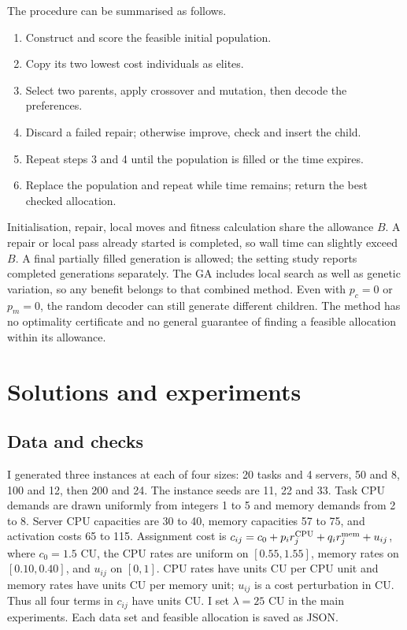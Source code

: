 \documentclass[10pt,a4paper]{article}
\begin{document}
\begin{minipage}{\textwidth}
The procedure can be summarised as follows.
\begin{enumerate}
\item Construct and score the feasible initial population.
\item Copy its two lowest cost individuals as elites.
\item Select two parents, apply crossover and mutation, then decode the preferences.
\item Discard a failed repair; otherwise improve, check and insert the child.
\item Repeat steps 3 and 4 until the population is filled or the time expires.
\item Replace the population and repeat while time remains; return the best checked allocation.
\end{enumerate}
\end{minipage}

Initialisation, repair, local moves and fitness calculation share the allowance
$B$. A repair or local pass already started is completed, so wall time can
slightly exceed $B$. A final partially filled generation is allowed; the setting
study reports completed generations separately. The GA includes local search
as well as genetic variation, so any benefit belongs to that combined method.
Even with $p_c=0$ or $p_m=0$, the random decoder can still generate different
children. The method has no optimality certificate and no general guarantee
of finding a feasible allocation within its allowance.

\section{Solutions and experiments}

\subsection{Data and checks}\label{sec:data-checks}

I generated three instances at each of four sizes: 20 tasks and 4 servers, 50
and 8, 100 and 12, then 200 and 24. The instance seeds are 11, 22 and 33.
Task CPU demands are drawn uniformly from integers 1 to 5 and memory demands
from 2 to 8. Server CPU capacities are 30 to 40, memory capacities 57 to 75,
and activation costs 65 to 115. Assignment cost is
$c_{ij}=c_0+p_ir^{\rm CPU}_j+q_ir^{\rm mem}_j+u_{ij}$, where $c_0=1.5$ CU, the CPU rates
are uniform on $[0.55,1.55]$, memory rates on $[0.10,0.40]$, and $u_{ij}$ on
$[0,1]$. CPU rates have units CU per CPU unit and memory rates have units
CU per memory unit; $u_{ij}$ is a cost perturbation in CU. Thus all four
terms in $c_{ij}$ have units CU. I set $\lambda=25$ CU in the main experiments.
Each data set and feasible allocation is saved as JSON.
\end{document}
